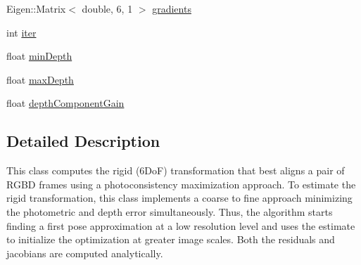 \begin{DoxyCompactItemize}
\item 
Eigen::Matrix$<$ double, 6, 1 $>$ \hyperlink{class_photoconsistency_odometry_1_1_bi_objective_1_1_c_photoconsistency_odometry_bi_objective_afc7ba59ecbc66587a6962da3e9ed7db3}{gradients}
\item 
int \hyperlink{class_photoconsistency_odometry_1_1_bi_objective_1_1_c_photoconsistency_odometry_bi_objective_a674c302e691993256dd46f7be45439ef}{iter}
\item 
float \hyperlink{class_photoconsistency_odometry_1_1_bi_objective_1_1_c_photoconsistency_odometry_bi_objective_adec531c1211633911c26103389dc3a8a}{minDepth}
\item 
float \hyperlink{class_photoconsistency_odometry_1_1_bi_objective_1_1_c_photoconsistency_odometry_bi_objective_a2fab9eb3d5a6951c70b916a1958afd1f}{maxDepth}
\item 
float \hyperlink{class_photoconsistency_odometry_1_1_bi_objective_1_1_c_photoconsistency_odometry_bi_objective_a36e4db1f8ff290be6b443d863975b7ab}{depthComponentGain}
\end{DoxyCompactItemize}


\subsection{Detailed Description}
This class computes the rigid (6DoF) transformation that best aligns a pair of RGBD frames using a photoconsistency maximization approach. To estimate the rigid transformation, this class implements a coarse to fine approach minimizing the photometric and depth error simultaneously. Thus, the algorithm starts finding a first pose approximation at a low resolution level and uses the estimate to initialize the optimization at greater image scales. Both the residuals and jacobians are computed analytically. 

